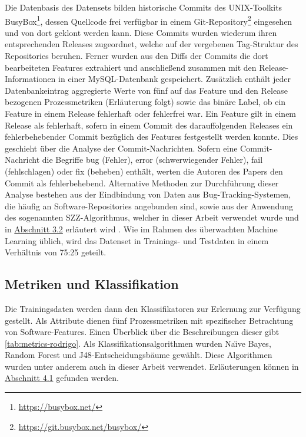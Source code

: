 Die Datenbasis des Datensets bilden historische Commits des UNIX-Toolkits BusyBox\footnote{\url{https://busybox.net/}}, dessen Quellcode frei verfügbar in einem Git-Repository\footnote{\url{https://git.busybox.net/busybox/}} eingesehen und von dort geklont werden kann. Diese Commits wurden wiederum ihren entsprechenden Releases zugeordnet, welche auf der vergebenen Tag-Struktur des Repositories beruhen. Ferner wurden aus den Diffs der Commits die dort bearbeiteten Features extrahiert und anschließend zusammen mit den Release-Informationen in einer MySQL-Datenbank gespeichert. Zusätzlich enthält jeder Datenbankeintrag aggregierte Werte von fünf auf das Feature und den Release bezogenen Prozessmetriken (Erläuterung folgt) sowie das binäre Label, ob ein Feature in einem Release fehlerhaft oder fehlerfrei war. Ein Feature gilt in einem Release als fehlerhaft, sofern in einem Commit des darauffolgenden Releases ein fehlerbehebender Commit bezüglich des Features festgestellt werden konnte. Dies geschieht über die Analyse der Commit-Nachrichten. Sofern eine Commit-Nachricht die Begriffe \glqq bug\grqq{} (Fehler), \glqq error\grqq{} (schwerwiegender Fehler), \glqq fail\grqq{} (fehlschlagen) oder \glqq fix\grqq{} (beheben) enthält, werten die Autoren des Papers den Commit als fehlerbehebend. Alternative Methoden zur Durchführung dieser Analyse bestehen aus der Eindbindung von Daten aus Bug-Tracking-Systemen, die häufig an Software-Repositories angebunden sind, sowie aus der Anwendung des sogenannten SZZ-Algorithmus, welcher in dieser Arbeit verwendet wurde und in \hyperref[szz-def]{Abschnitt 3.2} erläutert wird \cite{Sliwerski2005,Zimmermann2007}. Wie im Rahmen des überwachten Machine Learning üblich, wird das Datenset in Trainings- und Testdaten in einem Verhältnis von 75:25 geteilt. 

\subsection*{Metriken und Klassifikation}

Die Trainingsdaten werden dann den Klassifikatoren zur Erlernung zur Verfügung gestellt. Als Attribute dienen fünf Prozessmetriken mit spezifischer Betrachtung von Software-Features. Einen Überblick über die Beschreibungen dieser gibt \autoref{tab:metrics-rodrigo}. Als Klassifikationsalgorithmen wurden Na\"{\i}ve Bayes, Random Forest und J48-Entscheidungsbäume gewählt. Diese Algorithmen wurden unter anderem auch in dieser Arbeit verwendet. Erläuterungen können in \hyperref[algorithms]{Abschnitt 4.1} gefunden werden.

